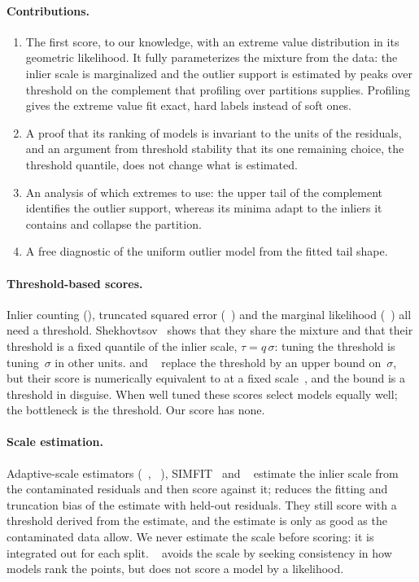 \paragraph{Contributions.}
\begin{enumerate}
	\item The first \ransac score, to our knowledge, with an extreme value
	      distribution in its geometric likelihood.  It fully parameterizes the
	      \gaussunif mixture from the data: the inlier scale is marginalized and
	      the outlier support is estimated by peaks over threshold on the
	      complement that profiling over partitions supplies.  Profiling gives
	      the extreme value fit exact, hard labels instead of soft ones.
	\item A proof that its ranking of models is invariant to the units of the
	      residuals, and an argument from threshold stability that its one
	      remaining choice, the threshold quantile, does not change what is
	      estimated.
	\item An analysis of which extremes to use: the upper tail of the
	      complement identifies the outlier support, whereas its minima adapt
	      to the inliers it contains and collapse the partition.
	\item A free diagnostic of the uniform outlier model from the fitted tail
	      shape.  
\end{enumerate}

\paragraph{Threshold-based scores.}
Inlier counting (\ransac), truncated squared error
(\msac~\cite{Torr1998}) and the \gaussunif marginal likelihood
(\mlesac~\cite{Torr2000}) all need a threshold.
Shekhovtsov~\cite{Shekhovtsov2025} shows that they share the \gaussunif
mixture and that their threshold is a fixed quantile of the inlier scale,
$\tau = q\,\sigma$: tuning the threshold is tuning~$\sigma$ in other
units.  \magsac and \magsacpp~\cite{Barath2019,Barath2020} replace the
threshold by an upper bound on~$\sigma$, but their score is numerically
equivalent to \mlesac at a fixed scale~\cite{Shekhovtsov2025}, and the
bound is a threshold in disguise.  When well tuned these scores select
models equally well; the bottleneck is the threshold.  Our score has none.

\paragraph{Scale estimation.}
Adaptive-scale estimators (\assc~\cite{Wang2004}, \askc~\cite{Wang2010}),
SIMFIT~\cite{Heinrich2013} and \simfitpp~\cite{Edstedt2025} estimate the
inlier scale from the contaminated residuals and then score against it;
\simfitpp reduces the fitting and truncation bias of the estimate with
held-out residuals.  They still score with a threshold derived from the
estimate, and the estimate is only as good as the contaminated data allow.
We never estimate the scale before scoring: it is integrated out for each
split.  \recon~\cite{Raguram2011} avoids the scale by seeking consistency
in how models rank the points, but does not score a model by a likelihood.

